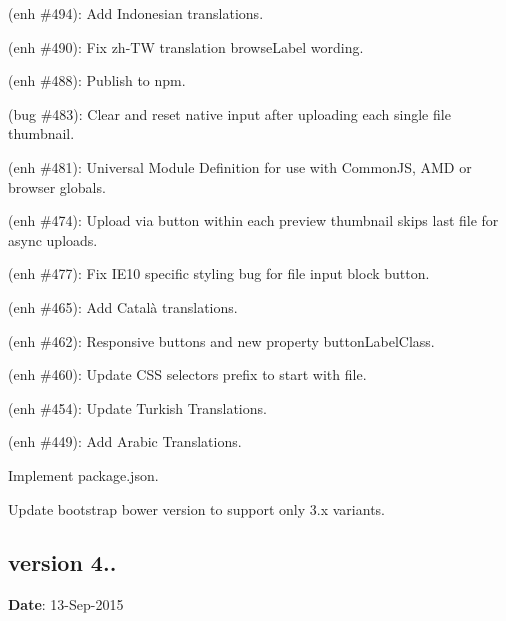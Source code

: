\begin{DoxyItemize}
\item (enh \#494)\+: Add Indonesian translations.
\item (enh \#490)\+: Fix {\ttfamily zh-\/\+TW} translation {\ttfamily browse\+Label} wording.
\item (enh \#488)\+: Publish to npm.
\item (bug \#483)\+: Clear and reset native input after uploading each single file thumbnail.
\item (enh \#481)\+: Universal Module Definition for use with Common\+JS, A\+MD or browser globals.
\item (enh \#474)\+: Upload via button within each preview thumbnail skips last file for async uploads.
\item (enh \#477)\+: Fix I\+E10 specific styling bug for file input block button.
\item (enh \#465)\+: Add Català translations.
\item (enh \#462)\+: Responsive buttons and new property {\ttfamily button\+Label\+Class}.
\item (enh \#460)\+: Update C\+SS selectors prefix to start with {\ttfamily file}.
\item (enh \#454)\+: Update Turkish Translations.
\item (enh \#449)\+: Add Arabic Translations.
\item Implement package.\+json.
\item Update bootstrap bower version to support only 3.\+x variants.
\end{DoxyItemize}

\subsection*{version 4..}

{\bfseries Date}\+: 13-\/\+Sep-\/2015


